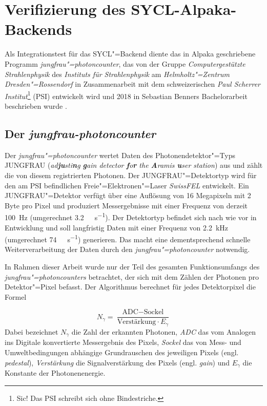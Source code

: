 \section{Verifizierung des SYCL-Alpaka-Backends}
\label{ergebnisse:verifizierung}

Als Integrationstest für das SYCL"=Backend diente das in Alpaka geschriebene
Programm \textit{jungfrau"=photoncounter}, das von der Gruppe
\textit{Computergestützte Strahlenphysik} des \textit{Instituts für
Strahlenphysik} am \textit{Helmholtz"=Zentrum Dresden"=Rossendorf} in
Zusammenarbeit mit dem schweizerischen
\textit{Paul Scherrer Institut}\footnote{Sic! Das PSI schreibt sich ohne
Bindestriche.} (PSI) entwickelt wird und 2018 in Sebastian Benners
Bachelorarbeit beschrieben wurde \cite[vgl.][]{benner2018}.

\subsection{Der \textit{jungfrau-photoncounter}}
\label{ergebnisse:verifizierung:jungfrau}

Der \textit{jungfrau"=photoncounter} wertet Daten des Photonendetektor"=Typs
JUNGFRAU (\textit{ad\textbf{ju}sti\textbf{n}g \textbf{g}ain detector
\textbf{f}o\textbf{r} the \textbf{A}ramis \textbf{u}ser station}) aus und zählt
die von diesem registrierten Photonen. Der JUNGFRAU"=Detektortyp wird für den am
PSI befindlichen Freie"=Elektronen"=Laser \textit{SwissFEL} entwickelt. Ein
JUNGFRAU"=Detektor verfügt über eine Auflösung von 16 Megapixeln mit 2 Byte pro
Pixel und produziert Messergebnisse mit einer Frequenz von derzeit
\SI{100}{\hertz} (umgerechnet \SI{3.2}{\giga\byte\per\second}). Der Detektortyp
befindet sich nach wie vor in Entwicklung und soll langfristig Daten mit einer
Frequenz von \SI{2.2}{\kilo\hertz} (umgerechnet \SI{74}{\giga\byte\per\second})
generieren. Das macht eine dementsprechend schnelle Weiterverarbeitung der Daten
durch den \textit{jungfrau"=photoncounter} notwendig.

In Rahmen dieser Arbeit wurde nur der Teil des gesamten Funktionsumfangs des
\textit{jungfrau"=photoncounters} betrachtet, der sich mit dem Zählen der
Photonen pro Detektor"=Pixel befasst. Der Algorithmus berechnet für jedes
Detektorpixel die Formel

\begin{equation}\label{ergebnisse:verifizierung:jungfrau:formel}
    N_\gamma = \frac{\text{ADC} - \text{Sockel}}{\text{Verstärkung} \cdot E_\gamma}
\end{equation}
\noindent
Dabei bezeichnet $N_\gamma$ die Zahl der erkannten Photonen, \textit{ADC} das
vom Analogen ins Digitale konvertierte Messergebnis des Pixels, \textit{Sockel}
das von Mess- und Umweltbedingungen abhängige Grundrauschen des jeweiligen
Pixels (engl. \textit{pedestal}), \textit{Verstärkung} die Signalverstärkung
des Pixels (engl. \textit{gain}) und $E_\gamma$ die Konstante der
Photonenenergie.

